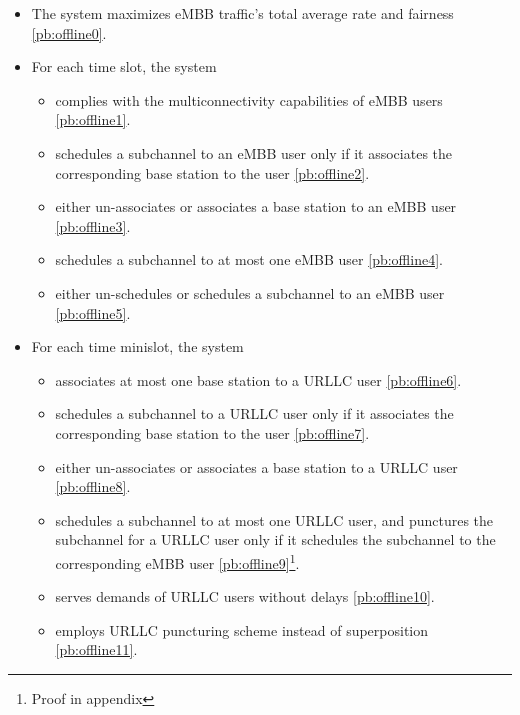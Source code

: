\begin{frame}
  \begin{itemize}
    \item The system maximizes eMBB traffic's total average rate and fairness \eqref{pb:offline0}.
    \item For each time slot, the system
      \begin{itemize}
        \item complies with the multiconnectivity capabilities of eMBB users \eqref{pb:offline1}.
        \item schedules a subchannel to an eMBB user only if it associates the corresponding base station to the user \eqref{pb:offline2}.
        \item either un-associates or associates a base station to an eMBB user \eqref{pb:offline3}.
        \item schedules a subchannel to at most one eMBB user \eqref{pb:offline4}.
        \item either un-schedules or schedules a subchannel to an eMBB user \eqref{pb:offline5}.
      \end{itemize}
  \end{itemize}
\end{frame}

\begin{frame}
  \begin{itemize}
    \item For each time minislot, the system
      \begin{itemize}
        \item associates at most one base station to a URLLC user \eqref{pb:offline6}.
        \item schedules a subchannel to a URLLC user only if it associates the corresponding base station to the user \eqref{pb:offline7}.
        \item either un-associates or associates a base station to a URLLC user \eqref{pb:offline8}.
        \item schedules a subchannel to at most one URLLC user, and punctures the subchannel for a URLLC user only if it schedules the subchannel to the corresponding eMBB user \eqref{pb:offline9}\footnote{Proof in appendix}.
        \item serves demands of URLLC users without delays \eqref{pb:offline10}.
        \item employs URLLC puncturing scheme instead of superposition \eqref{pb:offline11}.
      \end{itemize}
  \end{itemize}
\end{frame}
